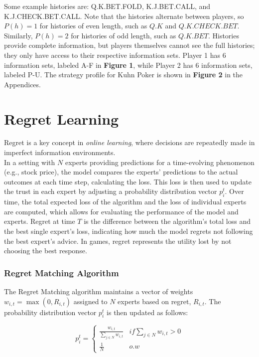 \documentclass{article}
\begin{document}
Some example histories are: Q.K.BET.FOLD, K.J.BET.CALL, and K.J.CHECK.BET.CALL. Note that the histories alternate between players, so \( P(h) = 1 \) for histories of even length, such as \( Q.K \) and \( Q.K.CHECK.BET \). Similarly, \( P(h) = 2 \) for histories of odd length, such as \( Q.K.BET \). Histories provide complete information, but players themselves cannot see the full histories; they only have access to their respective information sets. Player 1 has 6 information sets, labeled A-F in \textbf{Figure 1}, while Player 2 has 6 information sets, labeled P-U. The strategy profile for Kuhn Poker is shown in \textbf{Figure 2} in the Appendices.



\section{Regret Learning}

Regret is a key concept in \textit{online learning}, where decisions are repeatedly made in imperfect information environments. \\

In a setting with \( N \) experts providing predictions for a time-evolving phenomenon (e.g., stock price), the model compares the experts' predictions to the actual outcomes at each time step, calculating the loss. This loss is then used to update the trust in each expert by adjusting a probability distribution vector \( p_i^t \). Over time, the total expected loss of the algorithm and the loss of individual experts are computed, which allows for evaluating the performance of the model and experts. Regret at time \( T \) is the difference between the algorithm's total loss and the best single expert's loss, indicating how much the model regrets not following the best expert's advice. In games, regret represents the utility lost by not choosing the best response.

\subsubsection{Regret Matching Algorithm}

The Regret Matching algorithm maintains a vector of weights $w_{i,t} = \max(0, R_{i,t})$ assigned to $N$ experts based on regret, $R_{i,t}$. The probability distribution vector $p_i^t$ is then updated as follows: 

\[
p_i^t = 
\begin{cases}
	\frac{w_{i,t}}{\sum_{j \in N} w_{i,t}} & if \sum_{j\in N}w_{i,t} > 0 \\
	\frac{1}{N} & o.w
\end{cases}
\]
\end{document}
